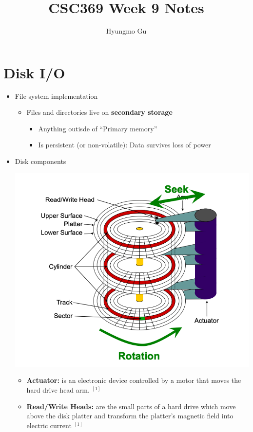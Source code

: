 \documentclass[12pt]{article}
\begin{document}
\title{CSC369 Week 9 Notes}
\author{Hyungmo Gu}
\maketitle

\section{Disk I/O}

\begin{itemize}
    \item File system implementation
    \begin{itemize}
        \item Files and directories live on \textbf{secondary storage}
        \begin{itemize}
            \item Anything outisde of ``Primary memory''
            \item Is persistent (or non-volatile): Data survives loss of power
        \end{itemize}
    \end{itemize}
    \item Disk components

    \begin{center}
        \includegraphics[width=0.8\linewidth]{images/week_9_notes_1_1.png}
    \end{center}

    \begin{itemize}
        \item \textbf{Actuator:} is an electronic device controlled by a motor
        that moves the hard drive head arm. $^{[1]}$
        \item \textbf{Read/Write Heads:} are the small parts of a hard drive which
        move above the disk platter and transform the platter's magnetic field into
        electric current $^{[1]}$


\end{itemize}
\end{itemize}
\end{document}
